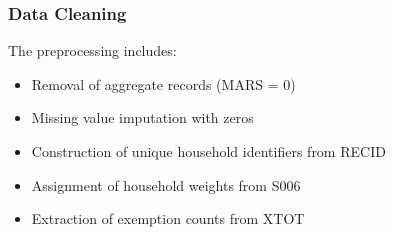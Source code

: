 \subsubsection{Data Cleaning}

The preprocessing includes:
\begin{itemize}
    \item Removal of aggregate records (MARS = 0)
    \item Missing value imputation with zeros
    \item Construction of unique household identifiers from RECID
    \item Assignment of household weights from S006
    \item Extraction of exemption counts from XTOT
\end{itemize}